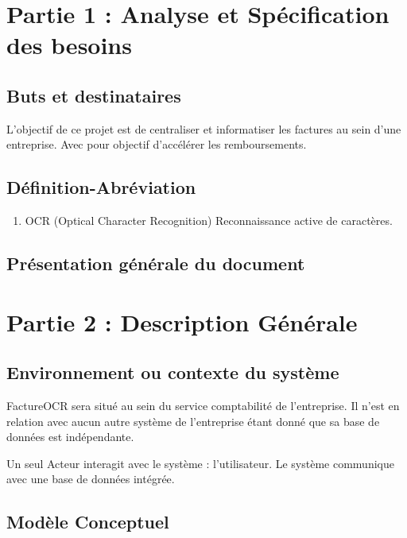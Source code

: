 \documentclass[a4paper,10pt]{article}
\title{}
\author{}
\begin{document}
\maketitle

\begin{abstract}

\end{abstract}


\section{Partie 1 : Analyse et Spécification des besoins}
\subsection{Buts et destinataires}
L'objectif de ce projet est de centraliser et informatiser les factures au sein d'une entreprise. Avec pour objectif d'accélérer les remboursements.

\subsection{Définition-Abréviation}
\begin{enumerate}
 \item{OCR} (Optical Character Recognition) Reconnaissance active de caractères.
\end{enumerate}

\subsection{Présentation générale du document}


\section{Partie 2 : Description Générale}
\subsection{Environnement ou contexte du système}
FactureOCR sera situé au sein du service comptabilité de l'entreprise.
Il n'est en relation avec aucun autre système de l'entreprise étant donné que sa base de données est indépendante.


Un seul Acteur interagit avec le système : l'utilisateur. Le système communique avec une base de données intégrée. 

\subsection{Modèle Conceptuel}
\end{document}
